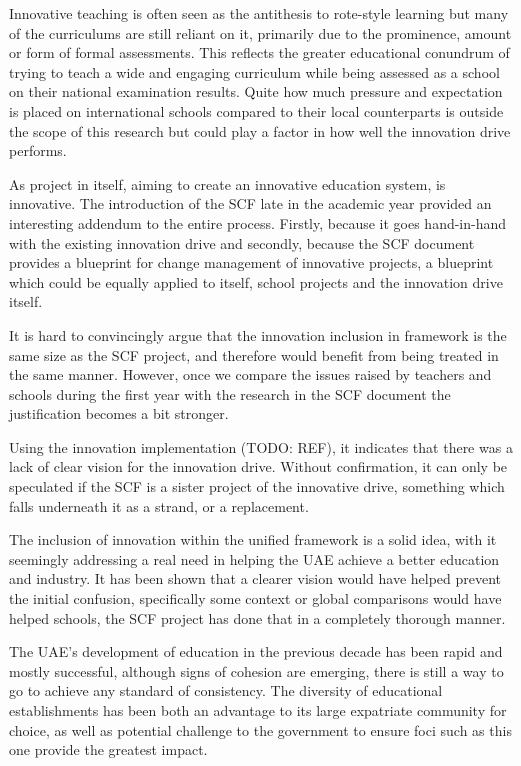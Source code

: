 Innovative teaching is often seen as the antithesis to rote-style learning but many of the curriculums are still reliant on it, primarily due to the prominence, amount or form of formal assessments. This reflects the greater educational conundrum of trying to teach a wide and engaging curriculum while being assessed as a school on their national examination results. Quite how much pressure and expectation is placed on international schools compared to their local counterparts is outside the scope of this research but could play a factor in how well the innovation drive performs.

As project in itself, aiming to create an innovative education system, is innovative. The introduction of the SCF late in the academic year provided an interesting addendum to the entire process. Firstly, because it goes hand-in-hand with the existing innovation drive and secondly, because the SCF document provides a blueprint for change management of innovative projects, a blueprint which could be equally applied to itself, school projects and the innovation drive itself.

It is hard to convincingly argue that the innovation inclusion in framework is the same size as the SCF project, and therefore would benefit from being treated in the same manner. However, once we compare the issues raised by teachers and schools during the first year with the research in the SCF document the justification becomes a bit stronger.

Using the innovation implementation (TODO: REF), it indicates that there was a lack of clear vision for the innovation drive. Without confirmation, it can only be speculated if the SCF is a sister project  of the innovative drive, something which falls underneath it as a strand, or a replacement.

The inclusion of innovation within the unified framework is a solid idea, with it seemingly addressing a real need in helping the UAE achieve a better education and industry. It has been shown that a clearer vision would have helped prevent the initial confusion, specifically some context or global comparisons would have helped schools, the SCF project has done that in a completely thorough manner.

The UAE’s development of education in the previous decade has been rapid and mostly successful, although signs of cohesion are emerging, there is still a way to go to achieve any standard of consistency. The diversity of educational establishments has been both an advantage to its large expatriate community for choice, as well as potential challenge to the government to ensure foci such as this one provide the greatest impact.

